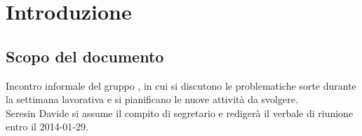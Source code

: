 \section{Introduzione}

\subsection{Scopo del documento}
Incontro informale del gruppo \gruppo{}, in cui si discutono le problematiche sorte durante la settimana lavorativa e si pianificano le nuove attività da svolgere.\\
Seresin Davide si assume il compito di segretario e redigerà il verbale di riunione entro il 2014-01-29.\\
